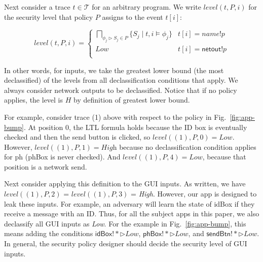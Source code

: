 \documentclass{llncs}
\newcommand{\code}[1]{\textsf{#1}} %
\newcommand{\aset}[1]{\{#1\}}
\newcommand{\sch}{\textit{name}}
\newcommand{\tr}{t\xspace}
\newcommand{\tset}{\ensuremath{\mathcal{T}}\xspace}
\newcommand{\tfuture}{\mathcal{F}}
\newcommand{\tlevel}[3]{\textit{level}(#1, #2, #3)}
\begin{document}


Next consider a trace $\tr \in \tset$ for an arbitrary program.
We write $\tlevel{\tr}{P}{i}$ for the security level that policy
$P$ assigns to the event $\tr[i]$:

\begin{displaymath}
  \tlevel{\tr}{P}{i} =
  \begin{cases}
    \bigsqcap_{\phi_j\rhd S_j \in P} \aset{ S_j \mid \tr, i \models
      \phi_j } & \tr[i] = \sch!p \\
    \textit{Low} & \tr[i] = \code{netout}!p \\
  \end{cases}
\end{displaymath}

In other words, for inputs, we take the greatest lower bound (the most
declassified) of the levels from all declassification conditions that
apply. We always consider network outputs to be
declassified. Notice that if no policy applies, the level is $H$ by
definition of greatest lower bound.

For example, consider trace (1) above with
respect to the policy in Fig.~\ref{fig:app-bump}.  At position 0, the
LTL formula holds because the ID box is eventually checked and then
the send button is clicked, so $\tlevel{(1)}{P}{0} =
\textit{Low}$. However,
$\tlevel{(1)}{P}{1} = \textit{High}$ because no
declassification condition applies for \code{ph}
(\code{phBox} is never checked). And $\tlevel{(1)}{P}{4} =
\textit{Low}$, because that position is a network send.

Next consider applying this definition to the GUI inputs. As written,
we have $\tlevel{(1)}{P}{2}$ = $\tlevel{(1)}{P}{3}$ =
\textit{High}. However, our app is designed to leak these inputs. 
For example, an adversary will learn the state of
\code{idBox} if they receive a message with an ID. Thus,
for all the subject apps in this paper, we also declassify all GUI inputs as
\textit{Low}. 
For the example in Fig.~\ref{fig:app-bump}, this means
adding the conditions
$\code{idBox!}\ast \rhd \textit{Low}$,
$\code{phBox!}\ast \rhd \textit{Low}$, and
$\code{sendBtn!}\ast \rhd \textit{Low}$. In general, 
the security policy designer should decide the security level of GUI inputs.
\end{document}
